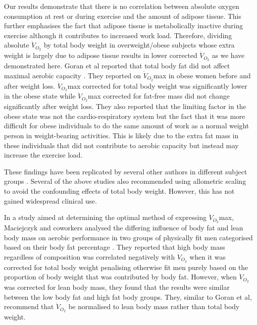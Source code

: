 Our results demonstrate that there is no correlation between absolute oxygen consumption at rest or during exercise and the amount of adipose tissue. 
This further emphasises the fact that adipose tissue is metabolically inactive during exercise although it contributes to increased work load. 
Therefore, dividing absolute $\dot{V}_{O_2}$ by total body weight in overweight/obese subjects whose extra weight is largely due to adipose tissue results in lower corrected $\dot{V}_{O_2}$ as we have demonstrated here. 
Goran et al reported that total body fat did not affect maximal aerobic capacity \parencite{goran_total_2000}. 
They reported on $\dot{V}_{O_2}$max in obese women before and after weight loss. $\dot{V}_{O_2}$max corrected for total body weight was significantly lower in the obese state while $\dot{V}_{O_2}$max corrected for fat-free mass did not change significantly after weight loss. 
They also reported that the limiting factor in the obese state was not the cardio-respiratory system but the fact that it was more difficult for obese individuals to do the same amount of work as a normal weight person in weight-bearing activities. 
This is likely due to the extra fat mass in these individuals that did not contribute to aerobic capacity but instead may increase the exercise load.

These findings have been replicated by several other authors in different subject groups \parencite{loftin_scaling_2001,  lemaitre_maximum_2006,savonen_current_2012, krachler_cardiopulmonary_2014}. 
Several of the above studies also recommended using allometric scaling to avoid the confounding effects of total body weight. 
However, this has not gained widespread clinical use.

In a study aimed at determining the optimal method of expressing $\dot{V}_{O_2}$max, Maciejczyk and coworkers analysed the differing influence of body fat and lean body mass on aerobic performance in two groups of physically fit men categorised based on their body fat percentage \parencite{maciejczyk_influence_2014}. 
They reported that high body mass regardless of composition was correlated negatively with $\dot{V}_{O_2}$ when it was corrected for total body weight penalising otherwise fit men purely based on the proportion of body weight that was contributed by body fat. 
However, when $\dot{V}_{O_2}$ was corrected for lean body mass, they found that the results were similar between the low body fat and high fat body groups. 
They, similar to Goran et al\parencite{goran_total_2000}, recommend that $\dot{V}_{O_2}$ be normalised to lean body mass rather than total body weight.

